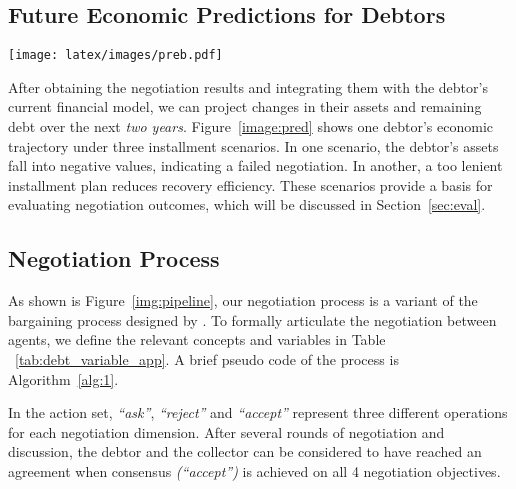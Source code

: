 


\subsection{Future Economic Predictions for Debtors}

\begin{figure*}[htbp]
  \centering
  \texttt{[image: latex/images/preb.pdf]}  
  \vspace{-0.3in}
  \caption{\label{image:pred}
The future trajectories of the debtor’s remaining assets and outstanding debt under three installment plans (6, 12, and 18 months from left to right) are shown, with all other variables held constant. The 6-month plan causes the debtor’s assets to fall \textbf{below zero}, making repayment impossible. In contrast, the 12-month and 18-month plans maintain a healthy asset level, though the 18-month plan significantly \textbf{reduces recovery efficiency}. The 12-month plan is the most balanced solution. Different background colors represent five difficulty tiers, with Tier 1 being the most challenging. The specific ranges and descriptions of the tiers are provided in Appendix~\ref{app:diff_cat}.}
\vspace{-0.1in}
\end{figure*}

After obtaining the negotiation results and integrating them with the debtor’s current financial model, we can project changes in their assets and remaining debt over the next \textit{two years}. Figure~\ref{image:pred} shows one debtor’s economic trajectory under three installment scenarios. In one scenario, the debtor’s assets fall into negative values, indicating a failed negotiation. In another, a too lenient installment plan reduces recovery efficiency. These scenarios provide a basis for evaluating negotiation outcomes, which will be discussed in Section~\ref{sec:eval}.

\subsection{Negotiation Process}

As shown is Figure~\ref{img:pipeline}, our negotiation process is a variant of the bargaining process designed by \citet{xia2024measuringbargainingabilitiesllms}. To formally articulate the negotiation between agents, we define the relevant concepts and variables in Table  ~\ref{tab:debt_variable_app}. A brief pseudo code of the process is Algorithm~\ref{alg:1}.

In the action set, \textit{“ask”}, \textit{“reject”} and \textit{“accept”} represent three different operations for each negotiation dimension. After several rounds of negotiation and discussion, the debtor and the collector can be considered to have reached an agreement when consensus \textit{(“accept”)} is achieved on all 4 negotiation objectives.



